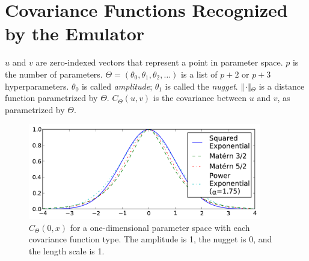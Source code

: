 
\section{Covariance Functions Recognized by the Emulator}
\label{CovarianceFunctions}

$u$ and $v$ are zero-indexed vectors that represent a point in parameter space.  $p$ is the number of parameters. $\Theta=(\theta_0, \theta_1,\theta_2,\ldots)$ is a list of $p+2$ or $p+3$ hyperparameters. $\theta_0$ is called \emph{amplitude}; $\theta_1$ is called the \emph{nugget}.  $\Vert\,\cdotp\Vert{}_\Theta$ is a distance function parametrized by $\Theta$.  $C_\Theta{}(u, v)$ is the covariance between $u$ and $v$, as parametrized by $\Theta$.  


\begin{figure}[b]
\includegraphics[width=4in]{figs/kernel_functions.pdf}
\parbox[b]{2.5in}
{\caption{\label{fig:kernelfunctions}
$C_\Theta{}(0, x)$ for a one-dimensional parameter space with each covariance function type. The amplitude is 1, the nugget is 0, and the length scale is 1.
\vspace*{30pt}
}}
\end{figure}

